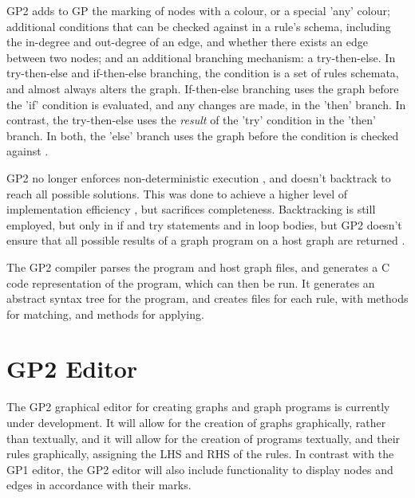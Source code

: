 \documentclass{UoYCSproject}
\begin{document}
GP2 adds to GP the marking of nodes with a colour, or a special 'any' colour; additional conditions that can be checked against in a rule's schema, including the in-degree and out-degree of an edge, and whether there exists an edge between two nodes; and an additional branching mechanism: a try-then-else. In try-then-else and if-then-else branching, the condition is a set of rules schemata, and almost always alters the graph. If-then-else branching uses the graph before the 'if' condition is evaluated, and any changes are made, in the 'then' branch. In contrast, the try-then-else uses the \emph{result} of the 'try' condition in the 'then' branch. In both, the 'else' branch uses the graph before the condition is checked against \cite{gp2_design}.

GP2 no longer enforces non-deterministic execution \cite[p. 15]{gp2_ide}, and doesn't backtrack to reach all possible solutions. This was done to achieve a higher level of implementation efficiency \cite[p. 15]{chris_compiler}, but sacrifices completeness. Backtracking is still employed, but only in if and try statements and in loop bodies, but GP2 doesn't ensure that all possible results of a graph program on a host graph are returned \cite[p. 65]{chris_compiler}.


The GP2 compiler parses the program and host graph files, and generates a C code representation of the program, which can then be run. It generates an abstract syntax tree for the program, and creates files for each rule, with methods for matching, and methods for applying. 


\section{GP2 Editor}
The GP2 graphical editor for creating graphs and graph programs is currently under development. It will allow for the creation of graphs graphically, rather than textually, and it will allow for the creation of programs textually, and their rules graphically, assigning the LHS and RHS of the rules. In contrast with the GP1 editor, the GP2 editor will also include functionality to display nodes and edges in accordance with their marks.
\end{document}
